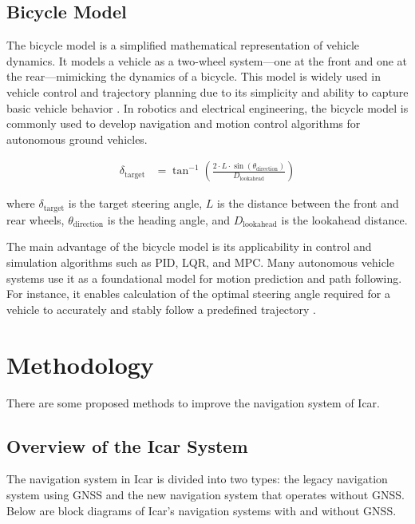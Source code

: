 \documentclass[conference]{IEEEtran}
\begin{document}
\subsection{Bicycle Model}
The bicycle model is a simplified mathematical representation of vehicle dynamics. It models a vehicle as a two-wheel system—one at the front and one at the rear—mimicking the dynamics of a bicycle. This model is widely used in vehicle control and trajectory planning due to its simplicity and ability to capture basic vehicle behavior \cite{rajamani2011vehicle}. In robotics and electrical engineering, the bicycle model is commonly used to develop navigation and motion control algorithms for autonomous ground vehicles.

\begin{equation}
	\begin{aligned}
		\delta_{\text{target}} &= \tan^{-1}\left( \frac{2 \cdot L \cdot \sin(\theta_{\text{direction}})}{D_{\text{lookahead}}} \right)
		\label{eq:bicycle_model_core}
	\end{aligned}		
\end{equation}

where \(\delta_{\text{target}}\) is the target steering angle, \(L\) is the distance between the front and rear wheels, \(\theta_{\text{direction}}\) is the heading angle, and \(D_{\text{lookahead}}\) is the lookahead distance.

\par
The main advantage of the bicycle model is its applicability in control and simulation algorithms such as PID, LQR, and MPC. Many autonomous vehicle systems use it as a foundational model for motion prediction and path following. For instance, it enables calculation of the optimal steering angle required for a vehicle to accurately and stably follow a predefined trajectory \cite{paden2016survey}.


\section{Methodology}
There are some proposed methods to improve the navigation system of Icar. 

\subsection{Overview of the Icar System} 
The navigation system in Icar is divided into two types: the legacy navigation system using GNSS and the new navigation system that operates without GNSS. Below are block diagrams of Icar's navigation systems with and without GNSS.
\end{document}
